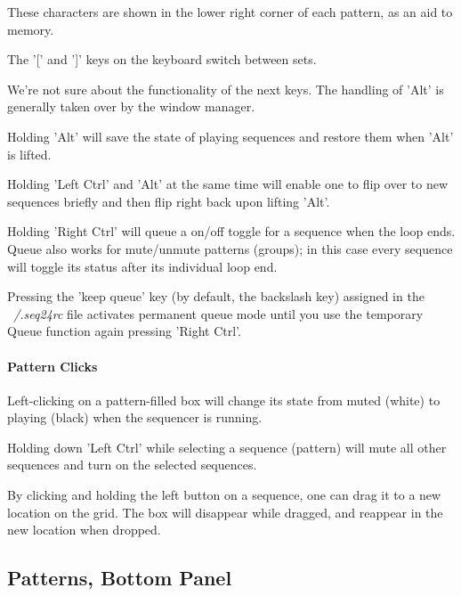    These characters are shown in the lower right corner of each
   pattern, as an aid to memory.

   The \index{keys![} '[' and
   \index{keys!]} ']' keys on the keyboard
   switch between sets.

   We're not sure about the functionality of the next keys.
   The handling of 'Alt' is generally taken over by the window manager.

	Holding 'Alt' will save the state of playing sequences
	and restore them when 'Alt' is lifted.

	Holding 'Left Ctrl' and 'Alt' at the same time will enable
	one to flip over to new sequences briefly and then
	flip right back upon lifting 'Alt'.

	Holding 'Right Ctrl' will queue a on/off toggle for a 
	sequence when the loop ends. Queue also works for mute/unmute 
	patterns (groups); in this case every sequence will toggle 
	its status after its individual loop end. 

	Pressing the 'keep queue' key (by default, the backslash key)
   assigned in the \textsl{~/.seq24rc} file
	activates permanent queue mode until you use the temporary 
	Queue function again pressing 'Right Ctrl'. 

\paragraph{Pattern Clicks}
\label{paragraph:seq24_patterns_pattern_Clicks}

   Left-clicking on a pattern-filled box will change its state
   from muted (white) to playing (black) when
   the sequencer is running.

   Holding down 'Left Ctrl' while selecting a sequence (pattern)
   will mute all other sequences and turn on the selected
   sequences.

   By clicking and holding the left button on a sequence,
   one can drag it to a new location on the grid.  The box
   will disappear while dragged, and reappear in the new location when
   dropped.

\subsection{Patterns, Bottom Panel}
\label{subsec:seq24_patterns_panel_bottom}

